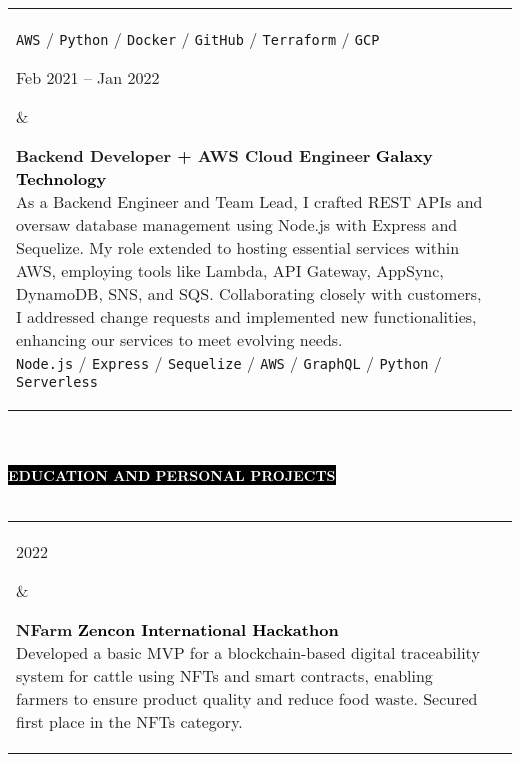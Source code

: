 \documentclass[10pt,A4]{article}
\makeatletter
\newcounter{a}
\newcounter{b}
\newcounter{c}
\newcommand{\cvsection}[1] {
	\textcolor{white}{\MakeUppercase{\textbf{#1}}}
}
\newcommand{\cvsect}[1]{
	\colorbox{black}{{\cvsection{#1}}}\\\\%
}
\newenvironment{entrylist}{%
	\begin{tabular*}{\textwidth}[t]{@{\extracolsep{\fill}}ll}
	}{%
	\end{tabular*}
}
\newcommand{\entry}[4]{%
	\parbox[t]{3.5cm}{%
		#1%
	}%
	&\parbox[t]{14cm}{%
		\textbf{#2}%
		\hfill%
		{\footnotesize \textbf{\textcolor{black}{#3}}}\\%
		#4%
	}\\\\}
\newcommand{\slashsep}{
	\hspace{2mm}/\hspace{2mm}
}
\makeatother
\begin{document}
\begin{entrylist}
{			\texttt{AWS}\slashsep\texttt{Python}\slashsep\texttt{Docker}\slashsep\texttt{GitHub}\slashsep\texttt{Terraform}\slashsep\texttt{GCP}}
		\entry
		{Feb 2021 – Jan 2022}
		{Backend Developer + AWS Cloud Engineer}
		{Galaxy Technology}
		{As a Backend Engineer and Team Lead, I crafted REST APIs and oversaw database
		management using Node.js with Express and Sequelize. My role extended to hosting
		essential services within AWS, employing tools like Lambda, API Gateway,
		AppSync, DynamoDB, SNS, and SQS. Collaborating closely with customers, I addressed
		change requests and implemented new functionalities, enhancing our services to
		meet evolving needs.\\
			\texttt{Node.js}\slashsep\texttt{Express}\slashsep\texttt{Sequelize}\slashsep\texttt{AWS}\slashsep\texttt{GraphQL}\slashsep\texttt{Python}\slashsep\texttt{Serverless}}
	\end{entrylist}
	\\\\


	\cvsect{Education and Personal Projects}
	\begin{entrylist}
		\entry
		{2022}
		{NFarm}
		{Zencon International Hackathon}
		{Developed a basic MVP for a blockchain-based digital traceability system for cattle using NFTs
		and smart contracts, enabling farmers to ensure product quality and reduce food waste. Secured
		first place in the NFTs category.}
		\entry
		{2019}
		{Lung Cancer Detection System with AI - Damai}
		{Expo Science International}
		{Developed an MVP system using Convolutional Neural Networks and image processing to detect lung
		cancer in its early stages.Selected as one of the top 100 projects representing Mexico at Expo
		Science International in Abu Dhabi, UAE.}
		\entry
		{2017 – 2020}
		{Software Engineering}
		{Universidad Politécnica de Durango (UNIPOLI)}
		{Graduated with a 9.42 score.}
	\end{entrylist}%
	\\\\

\end{document}

